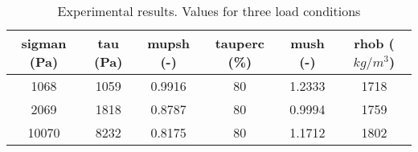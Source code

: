 \begin{table}[h]
\centering
\begin{tabular}{cccccc}
\hline
\acs{sigman} (Pa) & \acs{tau} (Pa) & \acs{mupsh} (-) & \acs{tauperc} (\%) &
\acs{mush} (-) & \acs{rhob} ($kg/m^3$) \\
\hline
    1068  & 1059  & 0.9916 & 80 & 1.2333 & 1718 \\
    2069  & 1818  & 0.8787 & 80 & 0.9994 & 1759 \\
    10070 & 8232  & 0.8175 & 80 & 1.1712 & 1802 \\

\hline
\end{tabular}
\caption[Experimental results]{Experimental results. Values for three
load conditions
}
\label{tab:05sinterTableExperimental}
\end{table}